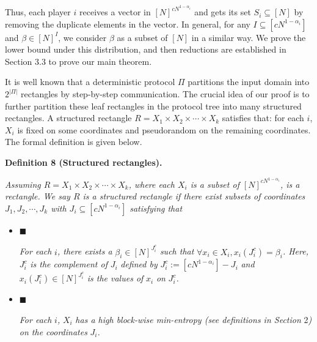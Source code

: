 \documentclass[10pt,a4paper]{article}
\begin{document}
Thus, each player $i$ receives a vector in $[N]^{cN^{1-\alpha_{i}}}$ and gets its set $S_{i}\subseteq[N]$ by removing the duplicate elements in the vector. In general, for any $I\subseteq[cN^{1-\alpha_{i}}]$ and $\beta\in[N]^{I}$, we consider $\beta$ as a subset of $[N]$ in a similar way. We prove the lower bound under this distribution, and then reductions are established in Section 3.3 to prove our main theorem.\par




It is well known that a deterministic protocol $\Pi$ partitions the input domain into $2^{|\Pi|}$ rectangles by step-by-step communication. The crucial idea of our proof is to further partition these leaf rectangles in the protocol tree into many structured rectangles. A structured rectangle $R=X_{1}\times X_{2}\times\cdots\times X_{k}$ satisfies that: for each $i$, $X_{i}$ is fixed on some coordinates and pseudorandom on the remaining coordinates. The formal definition is given below.\par





\par\medskip\noindent\textbf{
\textbf{Definition 8}\textbf{ }(Structured rectangles)\textbf{.}
}\par



\emph{Assuming $R=X_{1}\times X_{2}\times\cdots\times X_{k}$, where each $X_{i}$ is a subset of $[N]^{cN^{1-\alpha_{i}}}$, is a rectangle. We say $R$ is a structured rectangle if there exist subsets of coordinates $J_{1},J_{2},\cdots,J_{k}$ with $J_{i}\subseteq[cN^{1-\alpha_{i}}]$ satisfying that}\par


\begin{itemize}


\item[] 
$\blacksquare$ 


\emph{For each }$i$\emph{, there exists a }$\beta_{i}\in[N]^{J_{i}^{c}}$\emph{ such that }$\forall x_{i}\in X_{i},x_{i}(J_{i}^{c})=\beta_{i}$\emph{. Here, }$J_{i}^{c}$\emph{ is the complement of }$J_{i}$\emph{ defined by }$J_{i}^{c}:=[cN^{1-\alpha_{i}}]-J_{i}$\emph{ and }$x_{i}(J_{i}^{c})\in[N]^{J_{i}^{c}}$\emph{ is the values of }$x_{i}$\emph{ on }$J_{i}^{c}$\emph{.}\par





\item[] 
$\blacksquare$ 


\emph{For each }$i$\emph{, }$X_{i}$\emph{ has a high block-wise min-entropy (see definitions in Section }2\emph{) on the coordinates }$J_{i}$\emph{.}\par





\end{itemize}
\end{document}
